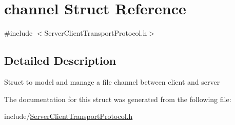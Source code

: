 \hypertarget{structchannel}{}\section{channel Struct Reference}
\label{structchannel}


{\ttfamily \#include $<$Server\+Client\+Transport\+Protocol.\+h$>$}



\subsection{Detailed Description}
Struct to model and manage a file channel between client and server 

The documentation for this struct was generated from the following file\+:\begin{DoxyCompactItemize}
\item 
include/\hyperlink{_server_client_transport_protocol_8h}{Server\+Client\+Transport\+Protocol.\+h}\end{DoxyCompactItemize}
